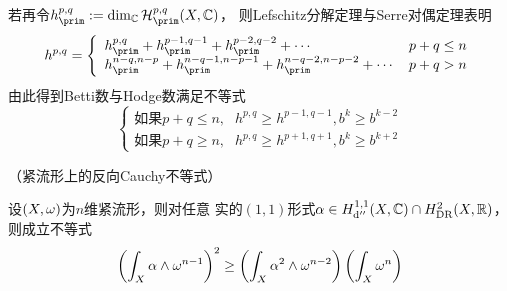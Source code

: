 若再令$h^{p,q}_{\prim}:=\dim_{\bbC}\mcalH^{p,q}_{\prim}(X,\bbC)$，
则Lefschitz分解定理与Serre对偶定理表明
$$
  h^{p,q}
=
  \left\{
    \begin{array}{ll}
      h^{p,q}_{\prim}
     +h^{p-1,q-1}_{\prim}
     +h^{p-2,q-2}_{\prim}+\cdots
    &p+q\leq n
    \\
      h^{n-q,n-p}_{\prim}
     +h^{n-q-1,n-p-1}_{\prim}
     +h^{n-q-2,n-p-2}_{\prim}+\cdots
    &p+q>n
    \end{array}
  \right.
$$
由此得到Betti数与Hodge数满足不等式
$$
  \left\{
    \begin{array}{ll}
      \text{如果$p+q\leq n$,}
     &h^{p,q}\geq h^{p-1,q-1},b^k\geq b^{k-2}\\
       \text{如果$p+q\geq n$,}
     &h^{p,q}\geq h^{p+1,q+1},b^k\geq b^{k+2}
    \end{array}
  \right.
$$


\begin{thm}（紧\Kahler 流形上的反向Cauchy不等式）

设$(X,\omega)$为$n$维紧\Kahler 流形，则对任意
实的$(1,1)$形式$\alpha\in H^{1,1}_{\mathrm{d}''}(X,\mathbb{C})\cap
H^2_{\operatorname{DR}}(X,\mathbb{R})$，则成立不等式
$$
  \left(
    \int_X\alpha\wedge\omega^{n-1}
  \right)^2
\geq
  \left(\int_X\alpha^2\wedge\omega^{n-2}\right)
  \left(\int_X\omega^n\right)
$$
\end{thm}


